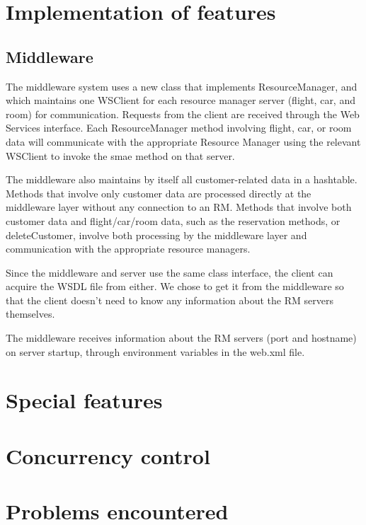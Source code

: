 \documentclass[11pt]{article}
\begin{document}
\section*{Implementation of features}

\subsection*{Middleware}

The middleware system uses a new class that implements ResourceManager, and which maintains one WSClient for each resource manager server (flight, car, and room) for communication. Requests from the client are received through the Web Services interface. Each ResourceManager method involving flight, car, or room data will communicate with the appropriate Resource Manager using the relevant WSClient to invoke the smae method on that server.  \par

The middleware also maintains by itself all customer-related data in a hashtable. Methods that involve only customer data are processed directly at the middleware layer without any connection to an RM. Methods that involve both customer data and flight/car/room data, such as the reservation methods, or deleteCustomer, involve both processing by the middleware layer and communication with the appropriate resource managers.  \par

Since the middleware and server use the same class interface, the client can acquire the WSDL file from either. We chose to get it from the middleware so that the client doesn't need to know any information about the RM servers themselves.  \par

The middleware receives information about the RM servers (port and hostname) on server startup, through environment variables in the web.xml file.  \par


\section*{Special features}

\section*{Concurrency control}

\section*{Problems encountered}
\end{document}
